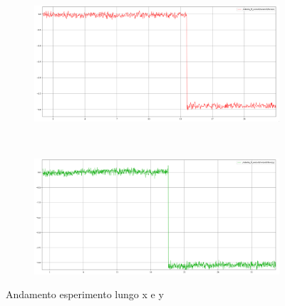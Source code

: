 \begin{figure}[H]
    \centering
    \begin{subfigure}[b]{0.80\textwidth}
        \includegraphics[width=\textwidth]{images/x_cut.png}
        \label{fig:x_cut}
    \end{subfigure}
    ~ %
    \begin{subfigure}[b]{0.80\textwidth}
        \includegraphics[width=\textwidth]{images/y_cut.png}
        \label{fig:y_cut}
    \end{subfigure}
    \caption{Andamento esperimento lungo x e y}\label{fig:cut_results}
\end{figure}
